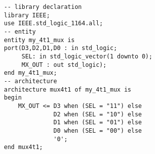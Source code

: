 \noindent
\begin{minipage}{0.62\linewidth}
\begin{lstlisting}[label=example_4, caption=Solution of Example 4.]
-- library declaration
library IEEE;
use IEEE.std_logic_1164.all;
-- entity
entity my_4t1_mux is
port(D3,D2,D1,D0 : in std_logic;
     SEL: in std_logic_vector(1 downto 0);
     MX_OUT	: out std_logic);
end my_4t1_mux;
-- architecture
architecture mux4t1 of my_4t1_mux is
begin
	MX_OUT <= D3 when (SEL = "11") else
	          D2 when (SEL = "10") else
	          D1 when (SEL = "01") else
	          D0 when (SEL = "00") else
	          '0';
end mux4t1;

\end{lstlisting}
\end{minipage}
\begin{minipage}{0.2\linewidth}
\begin{flushright}
\end{flushright}
\end{minipage}


